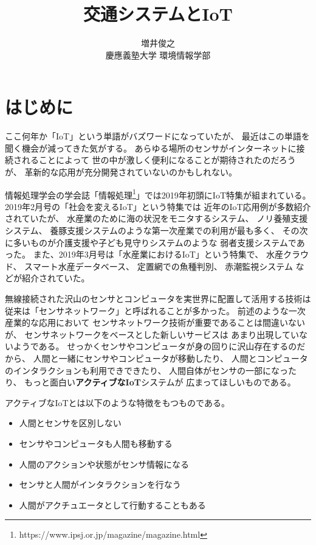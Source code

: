 \documentclass[twocolumn,10pt]{jarticle}
\title{交通システムとIoT}
\author{増井俊之 \\ 慶應義塾大学 環境情報学部}
\date{}
\begin{document}
\maketitle

\thispagestyle{empty}


\section{はじめに}
  
ここ何年か「IoT」という単語がバズワードになっていたが、
最近はこの単語を聞く機会が減ってきた気がする。
あらゆる場所のセンサがインターネットに接続されることによって
世の中が激しく便利になることが期待されたのだろうが、
革新的な応用が充分開発されていないのかもしれない。

情報処理学会の学会誌「情報処理\footnote{
  \textsf{https://www.ipsj.or.jp/magazine/magazine.html}
}」では2019年初頭にIoT特集が組まれている。
2019年2月号の「社会を変えるIoT」という特集では
近年のIoT応用例が多数紹介されていたが、
水産業のために海の状況をモニタするシステム、
ノリ養殖支援システム、
養豚支援システムのような第一次産業での利用が最も多く、
その次に多いものが介護支援や子ども見守りシステムのような
弱者支援システムであった。
また、2019年3月号は「水産業におけるIoT」という特集で、
水産クラウド、
スマート水産データベース、
定置網での魚種判別、
赤潮監視システム
などが紹介されていた。

無線接続された沢山のセンサとコンピュータを実世界に配置して活用する技術は
従来は「センサネットワーク」と呼ばれることが多かった。
前述のような一次産業的な応用において
センサネットワーク技術が重要であることは間違いないが、
センサネットワークをベースとした新しいサービスは
あまり出現していないようである。
せっかくセンサやコンピュータが身の回りに沢山存在するのだから、
人間と一緒にセンサやコンピュータが移動したり、
人間とコンピュータのインタラクションも利用できできたり、
人間自体がセンサの一部になったり、
もっと面白い\textbf{アクティブなIoT}システムが
広まってほしいものである。

アクティブなIoTとは以下のような特徴をもつものである。

\begin{itemize}
  \setlength{\itemsep}{0cm} %
  \item 人間とセンサを区別しない
  \item センサやコンピュータも人間も移動する
  \item 人間のアクションや状態がセンサ情報になる
  \item センサと人間がインタラクションを行なう
  \item 人間がアクチュエータとして行動することもある
\end{itemize}
\end{document}
